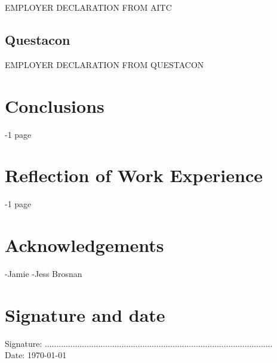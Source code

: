 \documentclass[11pt]{article}
\begin{document}
EMPLOYER DECLARATION FROM AITC

\newpage

\subsection{Questacon}

EMPLOYER DECLARATION FROM QUESTACON

\newpage

\section{Conclusions}
-1 page

\newpage

\section{Reflection of Work Experience}
-1 page

\newpage

\section{Acknowledgements}

-Jamie
-Jess Brosnan

\section{Signature and date}

\medskip

Signature: .................................................................................................. \\
Date: \today

\newpage
\end{document}
